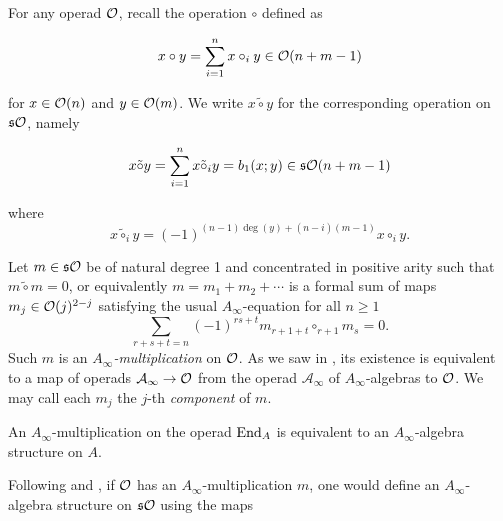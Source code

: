 \documentclass[Thesis.tex]{subfiles}
\begin{document}
For any operad ${\mathcal O}$, recall the operation $\circ$ defined as

\[
x\circ y=\sum_{i=1}^n x\circ_i y\in{\mathcal O}(n+m-1)
\]

for $x\in{\mathcal O}(n)$ and $y\in {\mathcal O}(m)$. We write $x\tilde{\circ}y$ for the corresponding operation on $\mathfrak{s}{\mathcal O}$, namely

\[
x\tilde{\circ} y=\sum_{i=1}^n x\tilde{\circ}_i y=b_1(x;y)\in\mathfrak{s}{\mathcal O}(n+m-1)
\]

where
\[x\tilde{\circ}_iy=(-1)^{(n-1)\deg(y)+(n-i)(m-1)}x\circ_i y.\]

\begin{defin}\label{ainftymultiplication}
Let $m\in\mathfrak{s}{\mathcal O}$ be of natural degree 1 and concentrated in positive arity such that $m\tilde{\circ}m=0$, or equivalently $m=m_1+m_2+\cdots$ is a formal sum of maps $m_j\in{\mathcal O}(j)^{2-j}$ satisfying the usual $A_\infty$-equation for all $n\geq 1$
\begin{equation}\label{Ainftyeq}
\sum_{r+s+t=n}(-1)^{rs+t}m_{r+1+t}\circ_{r+1}m_s=0.
\end{equation} 
Such $m$ is an \emph{$A_\infty$-multiplication} on ${\mathcal O}$. As we saw in , its existence is equivalent to a map of operads $\mathcal{A}_\infty\to {\mathcal O}$ from the operad $\mathcal{A}_\infty$ of $A_\infty$-algebras to ${\mathcal O}$. We may call each $m_j$ the $j$-th \emph{component} of $m$.
\end{defin}

\begin{remark}\label{multiplicationalgebra}
An $A_\infty$-multiplication on the operad $\operatorname{End}_A$ is equivalent to an $A_\infty$-algebra structure on $A$.
\end{remark}

Following \cite{GV} and \cite{getzler}, if ${\mathcal O}$ has an $A_\infty$-multiplication $m$, one would define an $A_\infty$-algebra structure on $\mathfrak{s}{\mathcal O}$ using the maps 
\end{document}

